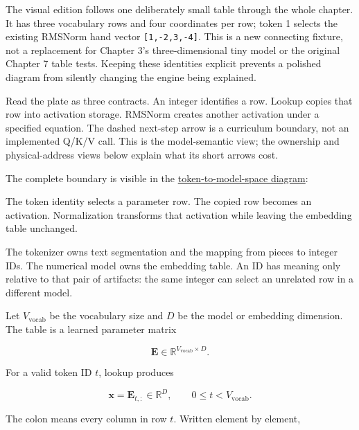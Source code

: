 
The visual edition follows one deliberately small table through the
whole chapter. It has three vocabulary rows and four coordinates per
row; token 1 selects the existing RMSNorm hand vector
\texttt{{[}1,-2,3,-4{]}}. This is a new connecting fixture, not a
replacement for Chapter 3's three-dimensional tiny model or the original
Chapter 7 table tests. Keeping these identities explicit prevents a
polished diagram from silently changing the engine being explained.

Read the plate as three contracts. An integer identifies a row. Lookup
copies that row into activation storage. RMSNorm creates another
activation under a specified equation. The dashed next-step arrow is a
curriculum boundary, not an implemented Q/K/V call. This is the
model-semantic view; the ownership and physical-address views below
explain what its short arrows cost.

The complete boundary is visible in the
\href{https://github.com/hermonai/inside-the-llm-engine/blob/astra-visual-rewrite/diagrams/transformer/token-to-model-space.txt}{token-to-model-space
diagram}:

The token identity selects a parameter row. The copied row becomes an activation. Normalization transforms that activation while leaving the embedding table unchanged.

The tokenizer owns text segmentation and the mapping from pieces to
integer IDs. The numerical model owns the embedding table. An ID has
meaning only relative to that pair of artifacts: the same integer can
select an unrelated row in a different model.

Let \(V_{\mathrm{vocab}}\) be the vocabulary size and \(D\) be the model
or embedding dimension. The table is a learned parameter matrix

\begin{equation}
\mathbf{E}\in\mathbb{R}^{V_{\mathrm{vocab}}\times D}.
\end{equation}

For a valid token ID \(t\), lookup produces

\begin{equation}
\mathbf{x}=\mathbf{E}_{t,:}\in\mathbb{R}^{D},
\qquad 0\le t<V_{\mathrm{vocab}}.
\end{equation}

The colon means every column in row \(t\). Written element by element,

